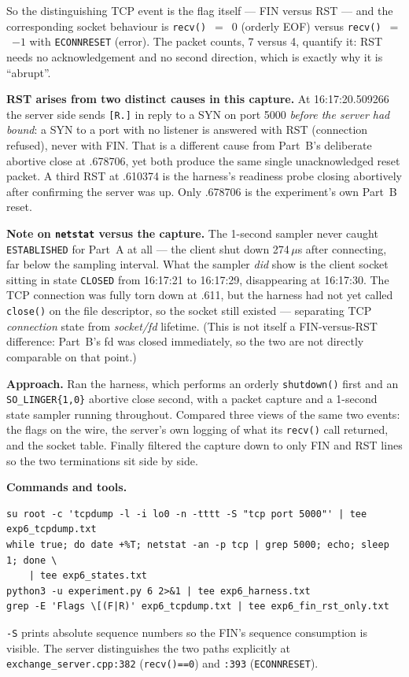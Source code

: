 \documentclass[11pt,a4paper]{article}
\newcommand{\cmd}[1]{\texttt{\small #1}}
\begin{document}
So the distinguishing TCP event is the flag itself --- FIN versus RST --- and the
corresponding socket behaviour is \cmd{recv()}~$=$~0 (orderly EOF) versus
\cmd{recv()}~$=$~$-1$ with \cmd{ECONNRESET} (error). The packet counts, 7
versus 4, quantify it: RST needs no acknowledgement and no second direction,
which is exactly why it is ``abrupt''.

\textbf{RST arises from two distinct causes in this capture.} At 16:17:20.509266
the server side sends \cmd{[R.]} in reply to a SYN on port 5000 \emph{before the
server had bound}: a SYN to a port with no listener is answered with RST
(connection refused), never with FIN. That is a different cause from Part~B's
deliberate abortive close at .678706, yet both produce the same single
unacknowledged reset packet. A third RST at .610374 is the harness's readiness
probe closing abortively after confirming the server was up. Only .678706 is the
experiment's own Part~B reset.

\textbf{Note on \cmd{netstat} versus the capture.} The 1-second sampler never
caught \cmd{ESTABLISHED} for Part~A at all --- the client shut down
274\,$\mu$s after connecting, far below the sampling interval. What
the sampler \emph{did} show is the client socket sitting in state \cmd{CLOSED}
from 16:17:21 to 16:17:29, disappearing at 16:17:30. The TCP connection was
fully torn down at .611, but the harness had not yet called \cmd{close()} on the
file descriptor, so the socket still existed --- separating TCP \emph{connection}
state from \emph{socket/fd} lifetime. (This is not itself a FIN-versus-RST
difference: Part~B's fd was closed immediately, so the two are not directly
comparable on that point.)

\textbf{Approach.} Ran the harness, which performs an orderly
\cmd{shutdown()} first and an \cmd{SO\_LINGER\{1,0\}} abortive close second,
with a packet capture and a 1-second state sampler running throughout. Compared
three views of the same two events: the flags on the wire, the server's own
logging of what its \cmd{recv()} call returned, and the socket table. Finally
filtered the capture down to only FIN and RST lines so the two terminations sit
side by side.

\textbf{Commands and tools.}
\begin{Verbatim}[fontsize=\small,frame=single]
su root -c 'tcpdump -l -i lo0 -n -tttt -S "tcp port 5000"' | tee exp6_tcpdump.txt
while true; do date +%T; netstat -an -p tcp | grep 5000; echo; sleep 1; done \
    | tee exp6_states.txt
python3 -u experiment.py 6 2>&1 | tee exp6_harness.txt
grep -E 'Flags \[(F|R)' exp6_tcpdump.txt | tee exp6_fin_rst_only.txt
\end{Verbatim}
\cmd{-S} prints absolute sequence numbers so the FIN's sequence consumption is
visible. The server distinguishes the two paths explicitly at
\cmd{exchange\_server.cpp:382} (\cmd{recv()==0}) and \cmd{:393}
(\cmd{ECONNRESET}).
\end{document}
